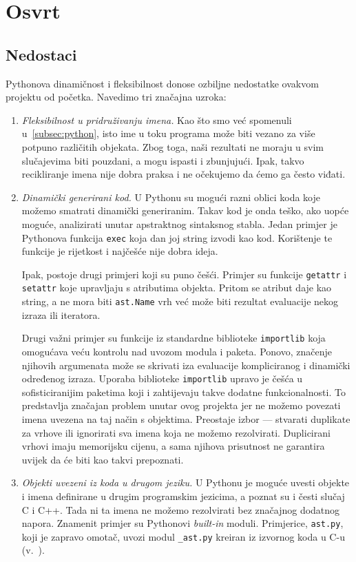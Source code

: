 \section{Osvrt}

\subsection{Nedostaci} \label{subsec:nedostaci}
Pythonova dinamičnost i fleksibilnost donose ozbiljne nedostatke ovakvom projektu od
početka. Navedimo tri značajna uzroka:

\begin{enumerate}

	\item \emph{Fleksibilnost u pridruživanju imena.} Kao što smo već spomenuli
u~\ref{subsec:python}, isto ime u toku programa može biti vezano za više
potpuno različitih objekata. Zbog toga, naši rezultati ne moraju u
svim slučajevima biti pouzdani, a mogu ispasti i zbunjujući. Ipak,
takvo recikliranje imena nije dobra praksa i ne očekujemo da ćemo ga
često viđati.

\item \emph{Dinamički generirani kod.} U Pythonu su mogući razni oblici koda
koje možemo smatrati dinamički generiranim. Takav kod je onda teško, ako
uopće moguće, analizirati unutar apstraktnog sintaksnog stabla.
Jedan primjer je Pythonova funkcija \texttt{exec} koja dan joj string
izvodi kao kod. Korištenje te funkcije je rijetkost i najčešće nije
dobra ideja.

Ipak, postoje drugi primjeri koji su puno češći. Primjer su
funkcije \texttt{getattr} i \texttt{setattr} koje upravljaju s
atributima objekta. Pritom se atribut daje kao string, a
ne mora biti \texttt{ast.Name} vrh već može biti rezultat
evaluacije nekog izraza ili iteratora.

Drugi važni primjer su funkcije iz standardne biblioteke
\texttt{importlib} koja omogućava veću kontrolu nad uvozom modula
i paketa. Ponovo, značenje njihovih argumenata može se skrivati
iza evaluacije kompliciranog i dinamički određenog izraza.
Uporaba biblioteke \texttt{importlib} upravo je češća u
sofisticiranijim paketima koji i zahtijevaju takve
dodatne funkcionalnosti. To predstavlja značajan problem unutar
ovog projekta jer ne možemo povezati imena uvezena na taj način
s objektima. Preostaje izbor --- stvarati duplikate za vrhove ili
ignorirati sva imena koja ne možemo rezolvirati. Duplicirani vrhovi
imaju memorijsku cijenu, a sama njihova prisutnost ne garantira
uvijek da će biti kao takvi prepoznati.

\item \emph{Objekti uvezeni iz koda u drugom jeziku.} U Pythonu
je moguće uvesti objekte i imena definirane u drugim 
programskim jezicima, a poznat su i česti slučaj C i
C++. Tada ni ta imena ne možemo rezolvirati bez značajnog
dodatnog napora. Znamenit primjer su Pythonovi \emph{built-in} moduli.
Primjerice, \texttt{ast.py}, koji je zapravo omotač,
uvozi modul \texttt{_ast.py} kreiran iz izvornog koda
u C-u (v.\ \cite{ast_u_c}).

\end{enumerate}

